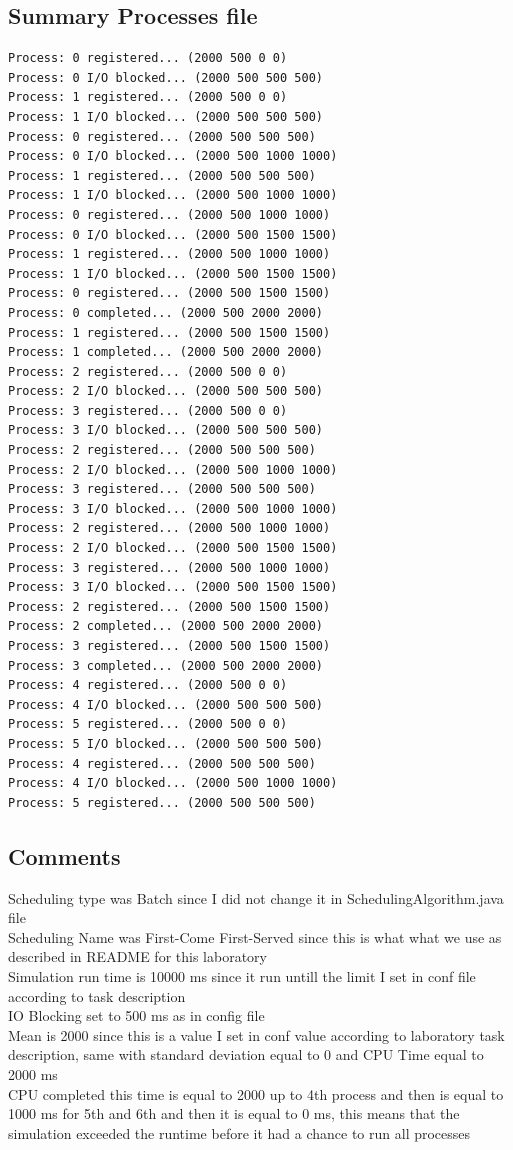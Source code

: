 \subsection{Summary Processes file}
\begin{lstlisting}         
Process: 0 registered... (2000 500 0 0)
Process: 0 I/O blocked... (2000 500 500 500)
Process: 1 registered... (2000 500 0 0)
Process: 1 I/O blocked... (2000 500 500 500)
Process: 0 registered... (2000 500 500 500)
Process: 0 I/O blocked... (2000 500 1000 1000)
Process: 1 registered... (2000 500 500 500)
Process: 1 I/O blocked... (2000 500 1000 1000)
Process: 0 registered... (2000 500 1000 1000)
Process: 0 I/O blocked... (2000 500 1500 1500)
Process: 1 registered... (2000 500 1000 1000)
Process: 1 I/O blocked... (2000 500 1500 1500)
Process: 0 registered... (2000 500 1500 1500)
Process: 0 completed... (2000 500 2000 2000)
Process: 1 registered... (2000 500 1500 1500)
Process: 1 completed... (2000 500 2000 2000)
Process: 2 registered... (2000 500 0 0)
Process: 2 I/O blocked... (2000 500 500 500)
Process: 3 registered... (2000 500 0 0)
Process: 3 I/O blocked... (2000 500 500 500)
Process: 2 registered... (2000 500 500 500)
Process: 2 I/O blocked... (2000 500 1000 1000)
Process: 3 registered... (2000 500 500 500)
Process: 3 I/O blocked... (2000 500 1000 1000)
Process: 2 registered... (2000 500 1000 1000)
Process: 2 I/O blocked... (2000 500 1500 1500)
Process: 3 registered... (2000 500 1000 1000)
Process: 3 I/O blocked... (2000 500 1500 1500)
Process: 2 registered... (2000 500 1500 1500)
Process: 2 completed... (2000 500 2000 2000)
Process: 3 registered... (2000 500 1500 1500)
Process: 3 completed... (2000 500 2000 2000)
Process: 4 registered... (2000 500 0 0)
Process: 4 I/O blocked... (2000 500 500 500)
Process: 5 registered... (2000 500 0 0)
Process: 5 I/O blocked... (2000 500 500 500)
Process: 4 registered... (2000 500 500 500)
Process: 4 I/O blocked... (2000 500 1000 1000)
Process: 5 registered... (2000 500 500 500)
\end{lstlisting}     
\subsection{Comments}
Scheduling type was Batch since I did not change it in SchedulingAlgorithm.java
file \\
Scheduling Name was First-Come First-Served since this is what what we use as
described in README for this laboratory \\
Simulation run time is 10000 ms since it run untill the limit I set in conf file
according to task description \\
IO Blocking set to 500 ms as in config file \\
Mean is 2000 since this is a value I set in conf value according to laboratory
task description, same with standard deviation equal to 0 and CPU Time equal to
2000 ms \\
CPU completed this time is equal to 2000 up to 4th process and then is equal to
1000 ms for 5th and 6th and then it is equal to 0 ms, this means that the
simulation exceeded the runtime before it had a chance to run all processes

